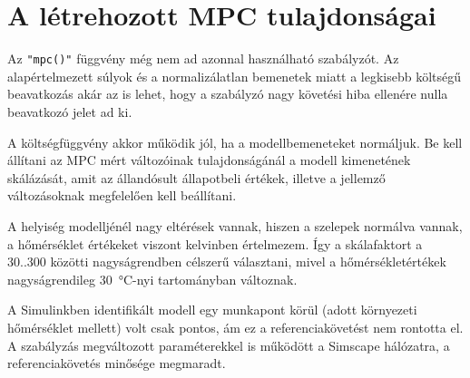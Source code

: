 


\section{A létrehozott MPC tulajdonságai}

Az \verb|"mpc()"| függvény még nem ad azonnal használható szabályzót. Az alapértelmezett súlyok és a normalizálatlan bemenetek miatt a legkisebb költségű beavatkozás akár az is lehet, hogy a szabályzó nagy követési hiba ellenére nulla beavatkozó jelet ad ki.

A költségfüggvény akkor működik jól, ha a modellbemeneteket normáljuk. Be kell állítani az MPC mért változóinak tulajdonságánál a modell kimenetének  skálázását, amit az állandósult állapotbeli értékek, illetve a jellemző változásoknak megfelelően kell beállítani.

A helyiség modelljénél nagy eltérések vannak, hiszen a szelepek normálva vannak, a hőmérséklet értékeket viszont kelvinben értelmezem. Így a skálafaktort a 30..300 közötti nagyságrendben célszerű választani, mivel a hőmérsékletértékek nagyságrendileg \SI{30}{\degreeCelsius}-nyi tartományban változnak.

A Simulinkben identifikált modell egy munkapont körül (adott környezeti hőmérséklet mellett) volt csak pontos, ám ez a referenciakövetést nem rontotta el. A szabályzás megváltozott paraméterekkel is működött a Simscape hálózatra, a referenciakövetés minősége megmaradt.





